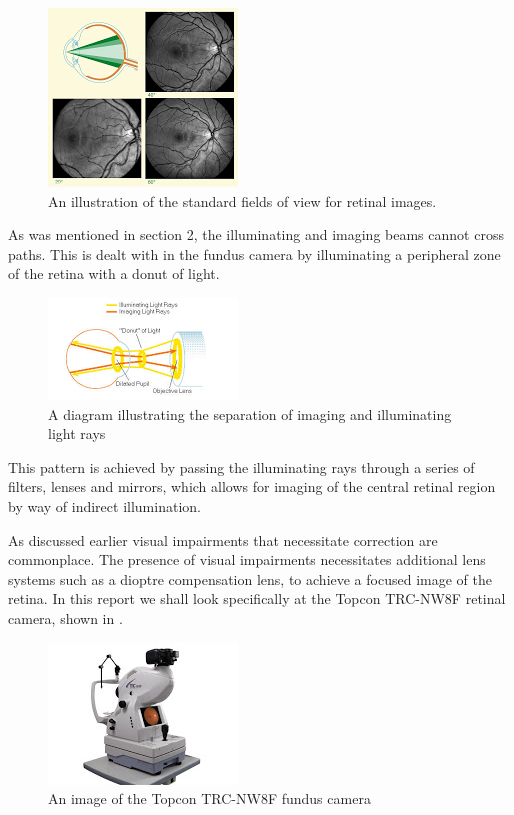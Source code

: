 \begin{figure}[H]
\centering
\includegraphics{figures/fieldofview}
\caption{An illustration of the standard fields of view for retinal images.}
\label{fig:fov}
\end{figure}

As was mentioned in section 2, the illuminating and imaging beams cannot cross paths. This is dealt with in the fundus camera by illuminating a peripheral zone of the retina with a donut of light.  

\begin{figure}[H]
\centering
\includegraphics{figures/lightdonut}
\caption{A diagram illustrating the separation of imaging and illuminating light rays}
\label{fig:ld}
\end{figure}

This pattern is achieved by passing the illuminating rays through a series
of filters, lenses and mirrors,  which allows for imaging of the
central retinal region by way of indirect illumination. 

As discussed earlier
visual impairments that necessitate correction are commonplace.
The presence of visual impairments necessitates additional lens systems
such as a dioptre compensation lens, to achieve a focused image of the
retina. In this report we shall look specifically at the Topcon TRC-NW8F
retinal camera, shown in .

\begin{figure}[H]
\centering
\includegraphics{figures/trc}
\caption{An image of the Topcon TRC-NW8F fundus camera}
\label{fig:trc}
\end{figure}


